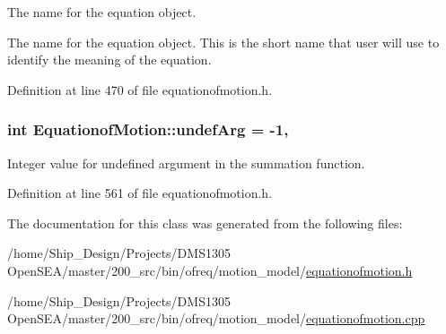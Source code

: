 The name for the equation object. 

The name for the equation object. This is the short name that user will use to identify the meaning of the equation. 

Definition at line 470 of file equationofmotion.\-h.

\hypertarget{classosea_1_1ofreq_1_1_equationof_motion_ad00063eabf1b5075b04c6d2507acebd4}{
\subsubsection[{undef\-Arg}]{\setlength{\rightskip}{0pt plus 5cm}int Equationof\-Motion\-::undef\-Arg = -\/1\hspace{0.3cm}{\ttfamily [static]}, {\ttfamily [protected]}}}\label{classosea_1_1ofreq_1_1_equationof_motion_ad00063eabf1b5075b04c6d2507acebd4}
Integer value for undefined argument in the summation function. 

Definition at line 561 of file equationofmotion.\-h.



The documentation for this class was generated from the following files\-:\begin{DoxyCompactItemize}
\item 
/home/\-Ship\-\_\-\-Design/\-Projects/\-D\-M\-S1305 Open\-S\-E\-A/master/200\-\_\-src/bin/ofreq/motion\-\_\-model/\hyperlink{equationofmotion_8h}{equationofmotion.\-h}\item 
/home/\-Ship\-\_\-\-Design/\-Projects/\-D\-M\-S1305 Open\-S\-E\-A/master/200\-\_\-src/bin/ofreq/motion\-\_\-model/\hyperlink{equationofmotion_8cpp}{equationofmotion.\-cpp}\end{DoxyCompactItemize}
